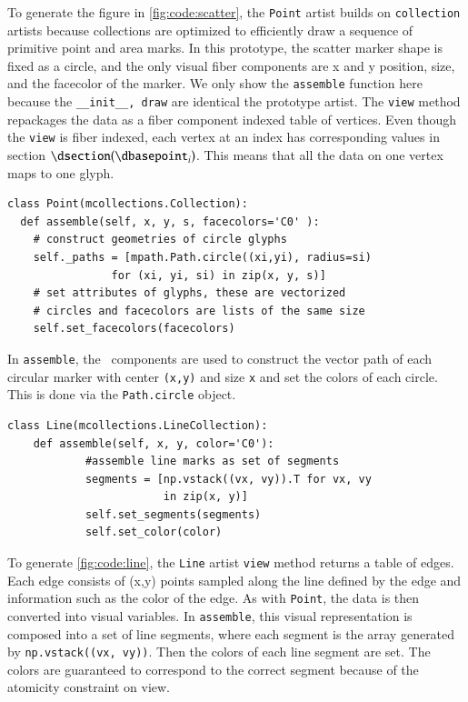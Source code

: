 \documentclass[journal]{vgtc}                %
\begin{document}
To generate the figure in \autoref{fig:code:scatter}, the \texttt{Point} artist builds on \texttt{collection} artists because collections are optimized to efficiently draw a sequence of primitive point and area marks. In this prototype, the scatter marker shape is fixed as a circle, and the only visual fiber components are x and y position, size, and the facecolor of the marker. We only show the \texttt{assemble} function here because the \texttt{__init__, draw} are identical the prototype artist. The \texttt{view} method repackages the data as a fiber component indexed table of vertices. Even though the \texttt{view} is fiber indexed, each vertex at an index \dbasepoint has corresponding values in section $\dsection(\dbasepoint_{i})$. This means that all the data on one vertex maps to one glyph.
\begin{verbatim}
class Point(mcollections.Collection):
  def assemble(self, x, y, s, facecolors='C0' ):
    # construct geometries of circle glyphs
    self._paths = [mpath.Path.circle((xi,yi), radius=si) 
                for (xi, yi, si) in zip(x, y, s)] 
    # set attributes of glyphs, these are vectorized 
    # circles and facecolors are lists of the same size
    self.set_facecolors(facecolors)
\end{verbatim} 
In \texttt{assemble}, the \vsection\ components are used to construct the vector path of each circular marker with center \texttt{(x,y)} and size \texttt{x} and set the colors of each circle. This is done via the \texttt{Path.circle} object. 
\begin{verbatim}
class Line(mcollections.LineCollection):
    def assemble(self, x, y, color='C0'):
            #assemble line marks as set of segments 
            segments = [np.vstack((vx, vy)).T for vx, vy 
                        in zip(x, y)]
            self.set_segments(segments)
            self.set_color(color)
\end{verbatim}
To generate \autoref{fig:code:line}, the \texttt{Line} artist \texttt{view} method returns a table of edges. Each edge consists of (x,y) points sampled along the line defined by the edge and information such as the color of the edge. As with \texttt{Point}, the data is then converted into visual variables. In \texttt{assemble}, this visual representation is composed into a set of line segments, where each segment is the array generated by \texttt{np.vstack((vx, vy))}. Then the colors of each line segment are set. The colors are guaranteed to correspond to the correct segment because of the atomicity constraint on view. 
\end{document}

